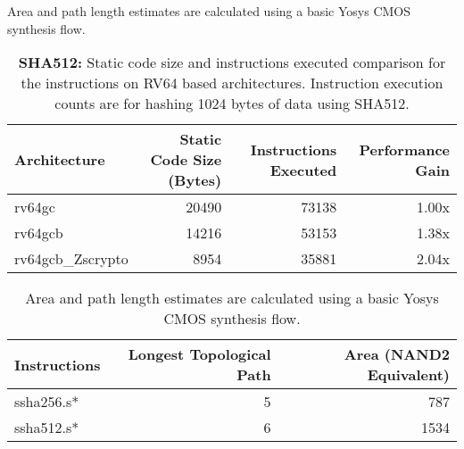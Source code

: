 Area and path length estimates are calculated using a basic Yosys CMOS
synthesis flow.

\begin{table}[h]
\centering
\begin{tabular}{lrrr}
Architecture      & Static Code Size (Bytes) & Instructions Executed & Performance Gain \\ \hline
rv64gc            & 20490                    & 73138 & 1.00x          \\
rv64gcb           & 14216                    & 53153 & 1.38x          \\
rv64gcb\_Zscrypto & 8954                     & 35881 & 2.04x 
\end{tabular}
\caption{{\bf SHA512:}
Static code size and instructions executed comparison for
the  instructions on RV64 based architectures.
Instruction execution counts are for hashing 1024 bytes of data
using SHA512.
}
\label{tab:benchmarks:sha512}
\end{table}

\begin{table}[h]
\centering
\begin{tabular}{lrr}
Instructions   & Longest Topological Path & Area (NAND2 Equivalent) \\ \hline
ssha256.s*     & 5                        & 787                   \\
ssha512.s*     & 6                        & 1534                  \\
\end{tabular}
\caption{
Area and path length estimates are calculated using a basic Yosys CMOS
synthesis flow.
}
\label{tab:benchmarks:sha2:rtl}
\end{table}

